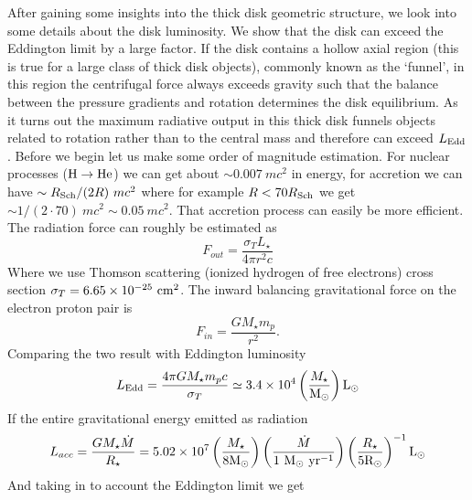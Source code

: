 \documentclass[modern]{aastex62}
\newcommand{\Lsun}{\mathrm{L_\odot}}
\newcommand{\Rsun}{\mathrm{R}_\odot}
\newcommand{\Msun}{\mathrm{M}_\odot}
\def \msyr{~\rm{M_{\odot}}~\rm{yr^{-1}}}
\def \cm{~\rm{cm}}
\begin{document}
After gaining some insights into the thick disk geometric structure, we look into some details about the disk luminosity. We show that the disk can exceed the Eddington limit by a large factor. If the disk contains a hollow axial region (this is true for a large class of thick disk objects), commonly known as the `funnel’, in this region the centrifugal force always exceeds gravity such that the balance between the pressure gradients and rotation determines the disk equilibrium.
As it turns out the maximum radiative output in this thick disk funnels objects related to rotation rather than to the central mass and therefore can exceed $L_{\rm{Edd}}$.
Before we begin let us make some order of magnitude estimation. 
For nuclear processes ($\rm{H}\rightarrow \rm{He}$) we can get about $\sim 0.007~mc^2$ in energy, for accretion we can have $\sim R_{\rm{Sch}}/(2R) ~ mc^2$ where for example $R<70R_{\rm{Sch}}$ we get $\sim 1/(2\cdot 70) ~mc^2 \sim 0.05~mc^2$. That accretion process can easily be more efficient. 
The radiation force can roughly be estimated as 
\begin{equation}
F_{out}=\frac{\sigma_T L_\star}{4\pi r^2 c}
\end{equation}
Where we use Thomson scattering (ionized hydrogen of free electrons) cross section $\sigma_T=6.65 \times 10^{-25} \cm^2$.
The inward balancing gravitational force on the electron proton pair is 
\begin{equation}
F_{in}=\frac{GM_\star m_p}{r^2}.
\end{equation}
Comparing the two result with Eddington luminosity 
\begin{equation}
L_{\rm{Edd}} = \frac{4\pi G M_\star m_p c}{\sigma_T}\simeq 3.4\times 10^4  \left( \frac{M_\star}{\Msun} \right) \Lsun
\end{equation}
If the entire gravitational energy emitted as radiation 
\begin{equation}
L_{acc} = \frac{G M_\star \dot M}{R_\star} =
5.02 \times 10^7  \left(\frac{M_\star}{8 \Msun}\right) 
\left(\frac{\dot M}{1 \msyr}\right) 
\left(\frac{R_\star}{5 \Rsun}\right)^{-1} \Lsun
\end{equation}
And taking in to account the Eddington limit we get
\end{document}
